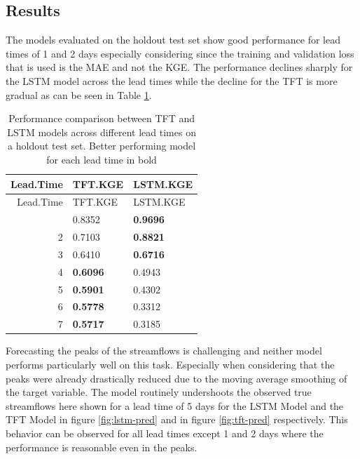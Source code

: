 \documentclass[
]{krantz}
\begin{document}
\subsection{Results}\label{results-2}

The models evaluated on the holdout test set show good performance for lead times of 1 and 2 days especially considering since the training and validation loss that is used is the MAE and not the KGE. The performance declines sharply for the LSTM model across the lead times while the decline for the TFT is more gradual as can be seen in Table \ref{tab:tab-results}.

\begin{longtable}[]{@{}rll@{}}
\caption{\label{tab:tab-results}Performance comparison between TFT and LSTM models across different lead times on a holdout test set. Better performing model for each lead time in bold}\tabularnewline
\toprule\noalign{}
Lead.Time & TFT.KGE & LSTM.KGE \\
\midrule\noalign{}
\endfirsthead
\toprule\noalign{}
Lead.Time & TFT.KGE & LSTM.KGE \\
\midrule\noalign{}
\endhead
\bottomrule\noalign{}
\endlastfoot
1 & 0.8352 & \textbf{0.9696} \\
2 & 0.7103 & \textbf{0.8821} \\
3 & 0.6410 & \textbf{0.6716} \\
4 & \textbf{0.6096} & 0.4943 \\
5 & \textbf{0.5901} & 0.4302 \\
6 & \textbf{0.5778} & 0.3312 \\
7 & \textbf{0.5717} & 0.3185 \\
\end{longtable}

Forecasting the peaks of the streamflows is challenging and neither model performs particularly well on this task. Especially when considering that the peaks were already drastically reduced due to the moving average smoothing of the target variable. The model routinely undershoots the observed true streamflows here shown for a lead time of 5 days for the LSTM Model and the TFT Model in figure \ref{fig:lstm-pred} and in figure \ref{fig:tft-pred} respectively. This behavior can be observed for all lead times except 1 and 2 days where the performance is reasonable even in the peaks.
\end{document}
